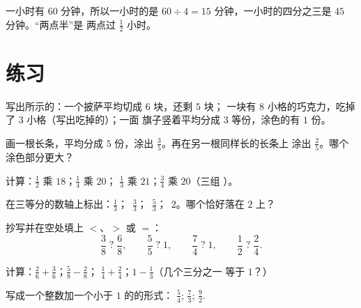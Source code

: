\begin{example}[一小时的四分之一]\label{ex:g4:fractions:hour}
一小时有 $60$ 分钟，所以一小时的是
$60 \div 4 = 15$ 分钟，一小时的四分之三是
$45$ 分钟。“两点半”是
两点过 $\frac12$ 小时。
\end{example}

\section{练习}

\begin{exercise}[$\star$]\label{exo:g4:fractions:1}
写出所示的：一个披萨平均切成 $6$ 块，还剩 $5$ 块；
一块有 $8$ 小格的巧克力，吃掉了 $3$ 小格（写出吃掉的）；一面
旗子竖着平均分成 $3$ 等份，涂色的有 $1$ 份。
\end{exercise}

\begin{exercise}[$\star$]\label{exo:g4:fractions:2}
画一根长条，平均分成 $5$ 份，涂出 $\frac35$。再在另一根同样长的长条上
涂出 $\frac{2}{5}$。哪个涂色部分更大？
\end{exercise}

\begin{exercise}[$\star$]\label{exo:g4:fractions:3}
计算：$\frac12$ 乘 $18$；\quad $\frac14$ 乘 $20$；\quad
$\frac13$ 乘 $21$；\quad $\frac34$ 乘 $20$（三组
）。
\end{exercise}

\begin{exercise}[$\star$]\label{exo:g4:fractions:4}
在三等分的数轴上标出：$\frac13$；\ $\frac33$；\
$\frac53$；\ $2$。哪个恰好落在 $2$ 上？
\end{exercise}

\begin{exercise}[$\star$]\label{exo:g4:fractions:5}
抄写并在空处填上 $<$、$>$ 或 $=$：
\[
\frac38 \;?\; \frac68, \qquad
\frac55 \;?\; 1, \qquad
\frac74 \;?\; 1, \qquad
\frac12 \;?\; \frac24 .
\]
\end{exercise}

\begin{exercise}[$\star$]\label{exo:g4:fractions:6}
计算：$\frac26 + \frac36$；\quad $\frac58 - \frac28$；\quad
$\frac14 + \frac24$；\quad $1 - \frac13$（几个三分之一
等于 $1$？）
\end{exercise}

\begin{exercise}[$\star$]\label{exo:g4:fractions:7}
写成一个整数加一个小于 $1$ 的的形式：
$\frac54$; \quad $\frac73$; \quad $\frac{9}{2}$.
\end{exercise}

